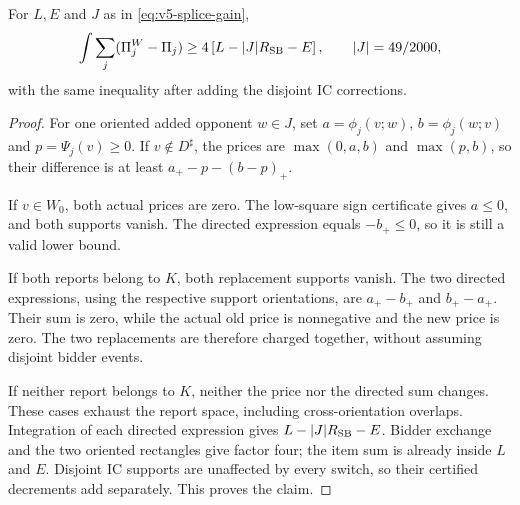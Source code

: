 \begin{lemma}\label{lem:overlap}
For $L,E$ and $J$ as in \eqref{eq:v5-splice-gain},
\[
 \int\sum_j(\Pi^W_j-\Pi_j)
 \ge4\left[L-|J|R_{\rm SB}-E\right],\qquad |J|=49/2000,
\]
with the same inequality after adding the disjoint IC corrections.
\end{lemma}
\begin{proof}
For one oriented added opponent $w\in J$, set
$a=\phi_j(v;w)$, $b=\phi_j(w;v)$ and $p=\Psi_j(v)\ge0$.
If $v\notin D^\sharp$, the prices are $\max(0,a,b)$ and
$\max(p,b)$, so their difference is at least
$a_+-p-(b-p)_+$.

If $v\in W_0$, both actual prices are zero. The low-square sign
certificate gives $a\le0$, and both supports vanish. The directed
expression equals $-b_+\le0$, so it is still a valid lower bound.

If both reports belong to $K$, both replacement supports vanish.
The two directed expressions, using the respective support orientations,
are $a_+-b_+$ and $b_+-a_+$. Their sum is zero, while the actual
old price is nonnegative and the new price is zero. The two replacements
are therefore charged together, without assuming disjoint bidder events.

If neither report belongs to $K$, neither the price nor the directed sum
changes. These cases exhaust the report space, including cross-orientation
overlaps. Integration of each directed expression gives
$L-|J|R_{\rm SB}-E$. Bidder exchange and the two oriented rectangles give
factor four; the item sum is already inside $L$ and $E$. Disjoint IC
supports are unaffected by every switch, so their certified decrements
add separately. This proves the claim.
\end{proof}
